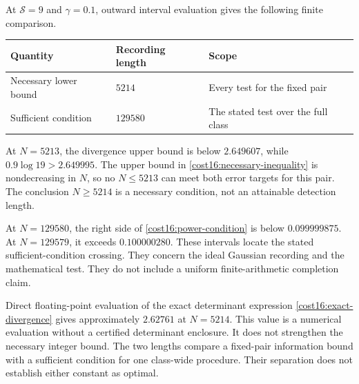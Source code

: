 At $\mathcal S=9$ and $\gamma=0.1$, outward interval evaluation gives the following finite comparison.
\begin{center}
\begin{tabular}{lll}
\toprule
Quantity&Recording length&Scope\\
\midrule
Necessary lower bound&$5214$&Every test for the fixed pair\\
Sufficient condition&$129580$&The stated test over the full class\\
\bottomrule
\end{tabular}
\end{center}
At $N=5213$, the divergence upper bound is below $2.649607$, while $0.9\log19>2.649995$. The upper bound in \eqref{cost16:necessary-inequality} is nondecreasing in $N$, so no $N\le5213$ can meet both error targets for this pair. The conclusion $N\ge5214$ is a necessary condition, not an attainable detection length.

At $N=129580$, the right side of \eqref{cost16:power-condition} is below $0.099999875$. At $N=129579$, it exceeds $0.100000280$. These intervals locate the stated sufficient-condition crossing. They concern the ideal Gaussian recording and the mathematical test. They do not include a uniform finite-arithmetic completion claim.

Direct floating-point evaluation of the exact determinant expression \eqref{cost16:exact-divergence} gives approximately $2.62761$ at $N=5214$. This value is a numerical evaluation without a certified determinant enclosure. It does not strengthen the necessary integer bound. The two lengths compare a fixed-pair information bound with a sufficient condition for one class-wide procedure. Their separation does not establish either constant as optimal.

